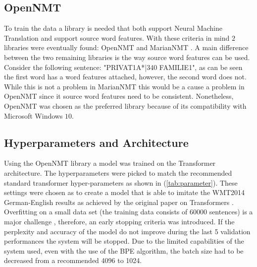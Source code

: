 \subsection{OpenNMT}
 
To train the data a library is needed that both support Neural Machine Translation and support source word features. With these criteria in mind $2$ libraries were eventually found: OpenNMT \cite{klein-etal-2017-opennmt} and MarianNMT \cite{mariannmt}. A main difference between the two remaining libraries is the way source word features can be used. Consider the following sentence: "PRIVAT1A*|340 FAMILIE1", as can be seen the first word has a word features attached, however, the second word does not. While this is not a problem in MarianNMT this would be a cause a problem in OpenNMT since it source word features need to be consistent. Nonetheless, OpenNMT was chosen as the preferred library because of its compatibility with Microsoft Windows $10$.

\subsection{Hyperparameters and Architecture}

Using the OpenNMT library \cite{klein-etal-2017-opennmt} a model was trained on the Transformer architecture. The hyperparameters were picked to match the recommended standard transformer hyper-parameters \cite{standard_hyperparameters} as shown in (\autoref{tab:parameter}). These settings were chosen as to create a model that is able to imitate the WMT2014 German-English \cite{WMT2014} results as achieved by the original paper on Transformers \cite{vaswani2017attention}. Overfitting on a small data set (the training data consists of $60000$ sentences) is a major challenge \cite{barone2017regularization}, therefore,  an early stopping criteria was introduced. If the perplexity and accuracy of the model do not improve during the last 5 validation performances the system will be stopped. Due to the limited capabilities of the system used, even with the use of the BPE algorithm, the batch size had to be decreased from a recommended 4096 to 1024.



